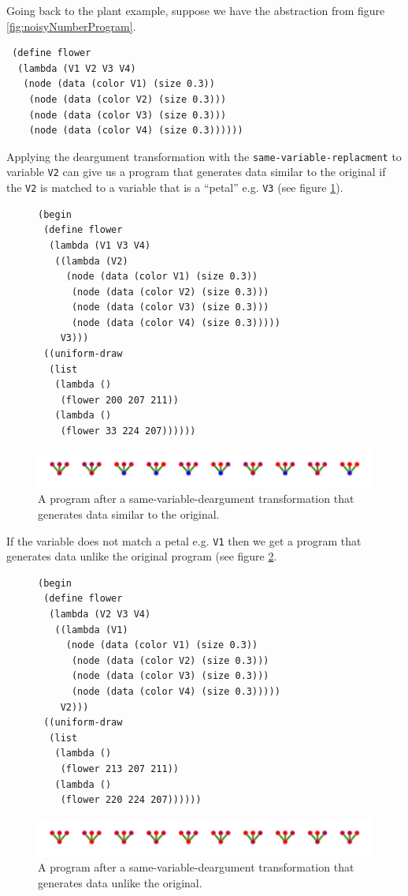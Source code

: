 \documentclass[a4paper,10pt]{article}
\begin{document}
Going back to the plant example, suppose we have the abstraction from figure \ref{fig:noisyNumberProgram}.
\begin{verbatim}
 (define flower
  (lambda (V1 V2 V3 V4)
   (node (data (color V1) (size 0.3))
    (node (data (color V2) (size 0.3)))
    (node (data (color V3) (size 0.3)))
    (node (data (color V4) (size 0.3))))))
\end{verbatim}
Applying the deargument transformation with the \texttt{same-variable-replacment} to variable \texttt{V2} can give us a program that generates data similar to the original if the \texttt{V2} is matched to a variable that is a ``petal'' e.g. \texttt{V3} (see figure \ref{fig:sameVarTrans1}).
\begin{figure}[h]
\begin{verbatim}
(begin
 (define flower
  (lambda (V1 V3 V4)
   ((lambda (V2)
     (node (data (color V1) (size 0.3))
      (node (data (color V2) (size 0.3)))
      (node (data (color V3) (size 0.3)))
      (node (data (color V4) (size 0.3)))))
    V3)))
 ((uniform-draw
  (list
   (lambda ()
    (flower 200 207 211))
   (lambda ()
    (flower 33 224 207))))))
\end{verbatim}
\begin{center}
\includegraphics[scale=.6]{sameVarTrans1.pdf}
\end{center}
\label{fig:sameVarTrans1}
\caption{A program after a same-variable-deargument transformation that generates data similar to the original.}
\end{figure}
If the variable does not match a petal e.g. \texttt{V1} then we get a program that generates data unlike the original program (see figure \ref{fig:sameVarTrans2}.
\begin{figure}[h]
\begin{verbatim}
(begin
 (define flower
  (lambda (V2 V3 V4)
   ((lambda (V1)
     (node (data (color V1) (size 0.3))
      (node (data (color V2) (size 0.3)))
      (node (data (color V3) (size 0.3)))
      (node (data (color V4) (size 0.3)))))
    V2)))
 ((uniform-draw
  (list
   (lambda ()
    (flower 213 207 211))
   (lambda ()
    (flower 220 224 207))))))
\end{verbatim}
\begin{center}
\includegraphics[scale=.6]{sameVarTrans2.pdf}
\end{center}
\label{fig:sameVarTrans2}
\caption{A program after a same-variable-deargument transformation that generates data unlike the original.}
\end{figure}
\end{document}

